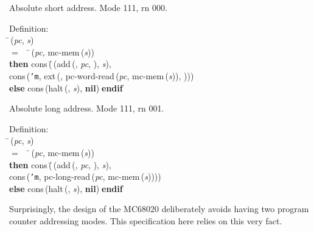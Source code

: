  Absolute short address.   Mode 111, rn 000.
\begin{tabbing}{\sc Definition}: \\  
\=\,({\it{pc\/}}, {\it{s\/}}) \\ 
$=$$\;\;\;\;$\=\,({\it{pc\/}}, {\rm{mc-mem}}\,({\it{s\/}})) \\ 
{\bf then }{\rm{cons}}\,(\=\,({\rm{add}}\,({}, {\it{pc\/}}, {}), {\it{s\/}}), \\ 
{\rm{cons}}\,({\tt{'}}{\tt{m}}, {\rm{ext}}\,({}, {\rm{pc-word-read}}\,({\it{pc\/}}, {\rm{mc-mem}}\,({\it{s\/}})), {})))\- \\ 
{\bf else }{\rm{cons}}\,({\rm{halt}}\,({}, {\it{s\/}}), {\bf{nil}})$\;${\bf  endif}\-\-
\end{tabbing}

 Absolute long address.  Mode 111, rn 001.
\begin{tabbing}{\sc Definition}: \\  
\=\,({\it{pc\/}}, {\it{s\/}}) \\ 
$=$$\;\;\;\;$\=\,({\it{pc\/}}, {\rm{mc-mem}}\,({\it{s\/}})) \\ 
{\bf then }{\rm{cons}}\,(\=\,({\rm{add}}\,({}, {\it{pc\/}}, {}), {\it{s\/}}), \\ 
{\rm{cons}}\,({\tt{'}}{\tt{m}}, {\rm{pc-long-read}}\,({\it{pc\/}}, {\rm{mc-mem}}\,({\it{s\/}}))))\- \\ 
{\bf else }{\rm{cons}}\,({\rm{halt}}\,({}, {\it{s\/}}), {\bf{nil}})$\;${\bf  endif}\-\-
\end{tabbing}

 Surprisingly, the design of the MC68020 deliberately avoids having
 two program counter addressing modes.  This specification here
 relies on this very fact.


